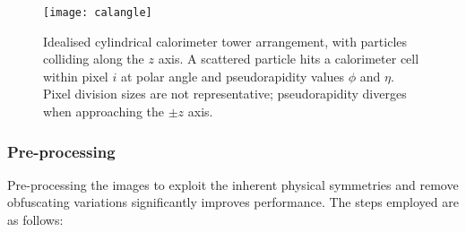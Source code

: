\documentclass[twocolumn]{article}
\begin{document}
\begin{figure}[H]
	\centering
	\texttt{[image: calangle]}
	
	\caption{Idealised cylindrical calorimeter tower arrangement, with particles colliding along the $z$ axis. A scattered particle hits a calorimeter cell within pixel $i$ at polar angle and pseudorapidity values $\phi$ and $\eta$. Pixel division sizes are not representative; pseudorapidity diverges when approaching the $\pm z$ axis.}
	\label{fig:calangle}
	
\end{figure}

\subsubsection{Pre-processing}
\label{sec:preproc}

Pre-processing the images to exploit the inherent physical symmetries and remove obfuscating variations significantly improves performance. The steps employed are as follows:
\end{document}
